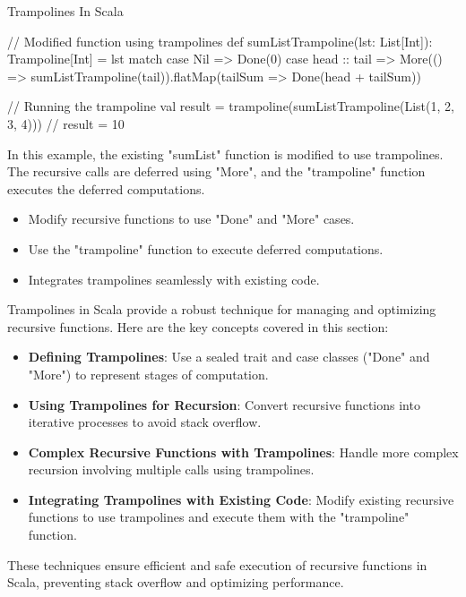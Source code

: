 \begin{notes}{Trampolines In Scala}
\begin{highlight}
\begin{code}[Scala]
    // Modified function using trampolines
    def sumListTrampoline(lst: List[Int]): Trampoline[Int] =
        lst match {
            case Nil => Done(0)
            case head :: tail => More(() => sumListTrampoline(tail)).flatMap(tailSum => Done(head + tailSum))
        }
    
    // Running the trampoline
    val result = trampoline(sumListTrampoline(List(1, 2, 3, 4)))  // result = 10
    \end{code}
    
        In this example, the existing "sumList" function is modified to use trampolines. The recursive calls are deferred using "More", and the "trampoline" function executes the deferred computations.
    
        \begin{itemize}
            \item Modify recursive functions to use "Done" and "More" cases.
            \item Use the "trampoline" function to execute deferred computations.
            \item Integrates trampolines seamlessly with existing code.
        \end{itemize}
    
    \end{highlight}
    
    \begin{highlight}
    
        Trampolines in Scala provide a robust technique for managing and optimizing recursive functions. Here are the key concepts covered in this section:
    
        \begin{itemize}
            \item \textbf{Defining Trampolines}: Use a sealed trait and case classes ("Done" and "More") to represent stages of computation.
            \item \textbf{Using Trampolines for Recursion}: Convert recursive functions into iterative processes to avoid stack overflow.
            \item \textbf{Complex Recursive Functions with Trampolines}: Handle more complex recursion involving multiple calls using trampolines.
            \item \textbf{Integrating Trampolines with Existing Code}: Modify existing recursive functions to use trampolines and execute them with the "trampoline" function.
        \end{itemize}
    
        These techniques ensure efficient and safe execution of recursive functions in Scala, preventing stack overflow and optimizing performance.
    
    \end{highlight}
\end{notes}

